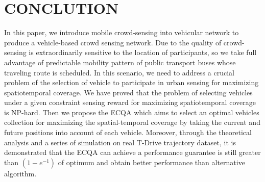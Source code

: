 \documentclass[journal]{IEEEtran}
\begin{document}
\section{CONCLUTION}
In this paper, we introduce mobile crowd-sensing into vehicular network to produce a vehicle-based crowd sensing network. Due to the quality of crowd-sensing is extraordinarily sensitive to the location of participants, so we take full advantage of predictable mobility pattern of public transport buses whose traveling route is scheduled. In this scenario, we need to address a crucial problem of the selection of vehicle to participate in urban sensing for maximizing spatiotemporal coverage. We have proved that the problem of selecting vehicles under a given constraint sensing reward for maximizing spatiotemporal coverage is NP-hard. Then we propose the ECQA which aims to select an optimal vehicles collection for maximizing the spatial-temporal coverage by taking the current and future positions into account of each vehicle. Moreover, through the theoretical analysis and a series of simulation on real T-Drive trajectory dataset, it is demonstrated that the ECQA can achieve a performance guarantee is still greater than $(1-e^{-1})$ of optimum and obtain better performance than alternative algorithm.












%
%
\end{document}
